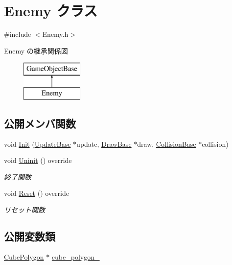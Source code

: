 \hypertarget{class_enemy}{}\section{Enemy クラス}
\label{class_enemy}


{\ttfamily \#include $<$Enemy.\+h$>$}

Enemy の継承関係図\begin{figure}[H]
\begin{center}
\leavevmode
\includegraphics[height=2.000000cm]{class_enemy}
\end{center}
\end{figure}
\subsection*{公開メンバ関数}
\begin{DoxyCompactItemize}
\item 
void \mbox{\hyperlink{class_enemy_a678f73f8af13e1bc55be3fdad2608399}{Init}} (\mbox{\hyperlink{class_update_base}{Update\+Base}} $\ast$update, \mbox{\hyperlink{class_draw_base}{Draw\+Base}} $\ast$draw, \mbox{\hyperlink{class_collision_base}{Collision\+Base}} $\ast$collision)
\item 
void \mbox{\hyperlink{class_enemy_a9aeaa757abdf0c37fd67c4ce5aed6962}{Uninit}} () override
\begin{DoxyCompactList}\small\item\em 終了関数 \end{DoxyCompactList}\item 
void \mbox{\hyperlink{class_enemy_ab86571061e7fcabcf8c646b1abad5581}{Reset}} () override
\begin{DoxyCompactList}\small\item\em リセット関数 \end{DoxyCompactList}\end{DoxyCompactItemize}
\subsection*{公開変数類}
\begin{DoxyCompactItemize}
\item 
\mbox{\hyperlink{class_cube_polygon}{Cube\+Polygon}} $\ast$ \mbox{\hyperlink{class_enemy_a9a24b765d76b789cc678701886570511}{cube\+\_\+polygon\+\_\+}}
\end{DoxyCompactItemize}
